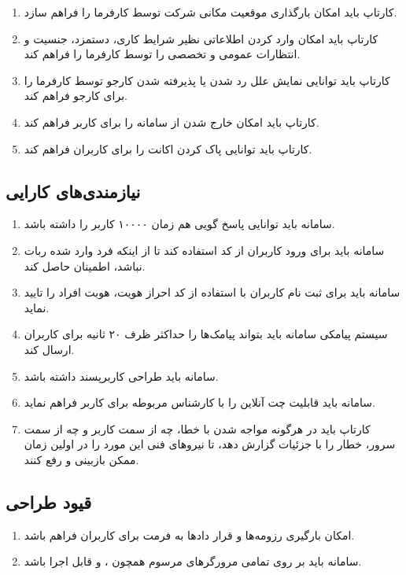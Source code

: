 \documentclass{report}
\begin{document}
\begin{enumerate}
					\item 
					کارتاپ باید امکان بارگذاری موقعیت مکانی شرکت توسط کارفرما را فراهم سازد.
					\item 
					کارتاپ باید امکان وارد کردن اطلاعاتی نظیر شرایط کاری، دستمزد، جنسیت و انتظارات عمومی و تخصصی را توسط کارفرما را فراهم کند.
					
					\item 
					کارتاپ باید توانایی نمایش علل رد شدن یا پذیرفته شدن کارجو توسط کارفرما را برای کارجو فراهم کند.
					
					\item 
					کارتاپ باید امکان خارج شدن از سامانه را برای کاربر فراهم کند.
					\item 
					کارتاپ باید توانایی پاک کردن اکانت را برای کاربران فراهم کند.
				\end{enumerate}
			\subsection{نیازمندی‌های کارایی}
				\begin{enumerate}
					\item 
					سامانه باید توانایی پاسخ گویی هم زمان ۱۰۰۰۰ کاربر را داشته باشد.
					\item 
					سامانه باید برای ورود کاربران از کد \lr{CAPCHA}  استفاده کند تا از اینکه فرد وارد شده ربات نباشد، اطمینان حاصل کند.
					\item 
					سامانه باید برای ثبت نام کاربران با استفاده از کد احراز هویت، هوبت افراد را تایید نماید.
					\item 
					سیستم پیامکی سامانه باید بتواند پیامک‌ها را حداکثر ظرف ۲۰ ثانیه برای کاربران ارسال کند.
					\item 
					سامانه باید طراحی کاربرپسند داشته باشد.
					\item 
					سامانه باید قابلیت چت آنلاین را با کارشناس مربوطه برای کاربر فراهم نماید.
					\item 
					کارتاپ باید در هرگونه مواجه شدن با خطا، چه از سمت کاربر و چه از سمت سرور، خطار را با جزئیات گزارش دهد، تا نیروهای فنی این مورد را در اولین زمان ممکن بازبینی و رفع کنند.
				\end{enumerate}
			\subsection{قیود طراحی}
			\begin{enumerate}
				\item 
				امکان بارگیری رزومه‌ها و قرار دادها به فرمت  برای کاربران فراهم باشد.
				\item 
				سامانه باید بر روی تمامی مرورگر‌های مرسوم همچون 
				،
				 و
				  قابل اجرا باشد.
			\end{enumerate}
\end{document}
